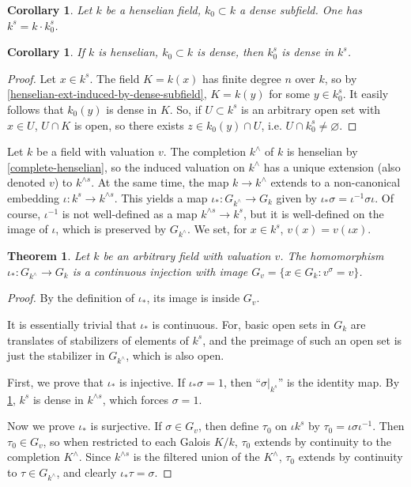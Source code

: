 \documentclass{article}
\newtheorem{theorem}[definition]{Theorem}
\newtheorem{corollary}[definition]{Corollary}
\numberwithin{definition}{subsection}
\begin{document}
\begin{corollary}\label{alg-closure-induced-by-subfield}
Let $k$ be a henselian field, $k_0\subset k$ a dense subfield. One has 
$k^s = k\cdot k_0^s$. 
\end{corollary}

\begin{corollary}\label{alg-closure-dense}
If $k$ is henselian, $k_0\subset k$ is dense, then $k_0^s$ is dense in 
$k^s$. 
\end{corollary}
\begin{proof}
Let $x\in k^s$. The field $K=k(x)$ has finite degree $n$ over $k$, so by 
\ref{henselian-ext-induced-by-dense-subfield}, $K = k(y)$ for some 
$y\in k_0^s$. It easily follows that $k_0(y)$ is dense in $K$. So, if 
$U\subset k^s$ is an arbitrary open set with $x\in U$, $U\cap K$ is open, so 
there exists $z\in k_0(y)\cap U$, i.e. $U\cap k_0^s\ne \varnothing$. 
\end{proof}

Let $k$ be a field with valuation $v$. The completion $k^\wedge$ of $k$ is 
henselian by \ref{complete-henselian}, so the induced valuation on $k^\wedge$ 
has a unique extension (also denoted $v$) to $k^{\wedge s}$. At the same time, 
the map $k\to k^\wedge$ extends to a non-canonical embedding 
$\iota:k^s\to k^{\wedge s}$. This yields a map $\iota_*:G_{k^\wedge}\to G_k$ 
given by $\iota_*\sigma = \iota^{-1}\sigma \iota$. Of course, $\iota^{-1}$ is 
not well-defined as a map $k^{\wedge s} \to k^s$, but it is well-defined on 
the image of $\iota$, which is preserved by $G_{k^\wedge}$. We set, for 
$x\in k^s$, $v(x) = v(\iota x)$. 

\begin{theorem}
Let $k$ be an arbitrary field with valuation $v$. The homomorphism 
$\iota_*:G_{k^\wedge} \to G_k$ is a continuous injection with image 
$G_v = \{x\in G_k : v^\sigma = v\}$. 
\end{theorem}
\begin{proof}
By the definition of $\iota_*$, its image is inside $G_v$. 

It is essentially trivial that $\iota_*$ is continuous. For, basic open sets 
in $G_k$ are translates of stabilizers of elements of $k^s$, and the preimage 
of such an open set is just the stabilizer in $G_{k^\wedge}$, which is also 
open. 

First, we prove that $\iota_*$ is injective. If $\iota_* \sigma = 1$, then 
``$\sigma|_{k^s}$'' is the identity map. By \ref{alg-closure-dense}, $k^s$ is 
dense in $k^{\wedge s}$, which forces $\sigma = 1$. 

Now we prove $\iota_*$ is surjective. If $\sigma\in G_v$, then define $\tau_0$ 
on $\iota k^s$ by $\tau_0 = \iota\sigma\iota^{-1}$. Then $\tau_0\in G_v$, so 
when restricted to each Galois $K/k$, $\tau_0$ extends by continuity to the 
completion $K^\wedge$. Since $k^{\wedge s}$ is the filtered union of the 
$K^\wedge$, $\tau_0$ extends by continuity to $\tau\in G_{k^\wedge}$, and 
clearly $\iota_* \tau = \sigma$. 
\end{proof}
\end{document}
